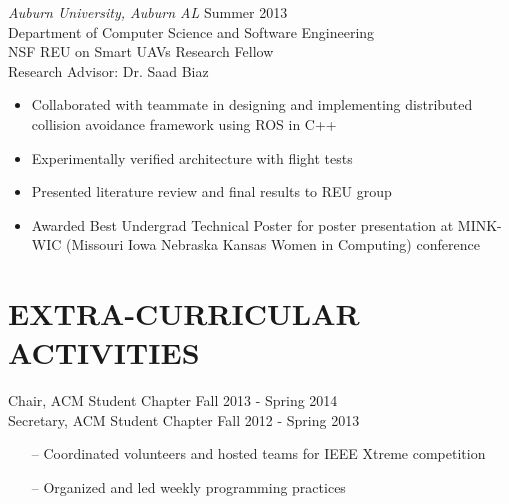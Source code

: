 \documentclass[line,margin]{res}
\begin{document}
\begin{resume}
		{\sl Auburn University, Auburn AL}  \hfill  Summer 2013\\
		Department of Computer Science and Software Engineering  \\
		NSF REU on Smart UAVs Research Fellow \\
		Research Advisor: Dr. Saad Biaz
                 \begin{itemize}[leftmargin=5mm]  \itemsep -2pt %
		 \item Collaborated with teammate in designing and implementing distributed collision avoidance framework using ROS in C++ 
		 \item Experimentally verified architecture with flight tests  
		 \item Presented literature review and final results to REU group
		 \item Awarded Best Undergrad Technical Poster for poster presentation at MINK-WIC (Missouri Iowa Nebraska Kansas Women in Computing) conference
                 \end{itemize} 
\section{EXTRA-CURRICULAR \\ ACTIVITIES}             
	
%
%	
%		

		Chair, ACM Student Chapter \hfill Fall 2013 - Spring 2014\\
		Secretary, ACM Student Chapter \hfill Fall 2012 - Spring 2013 
		         \begin{itemize} [leftmargin=5mm]  \itemsep -2pt %
                 \item[--] Coordinated volunteers and hosted teams for IEEE Xtreme competition 
                 \item[--] Organized and led weekly programming practices
                 \end{itemize} 


\end{resume}
\end{document}
